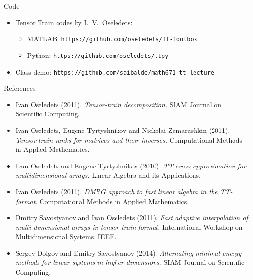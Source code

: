 \documentclass[aspectratio=169]{beamer}
\begin{document}
\begin{frame}{Code}
  \begin{itemize}
    \item
      Tensor Train codes by I.\ V.\ Oseledets:
      \begin{itemize}
        \item
          MATLAB: \texttt{https://github.com/oseledets/TT-Toolbox}
        \item
          Python: \texttt{https://github.com/oseledets/ttpy}
      \end{itemize}
    \item
      Class demo: \texttt{https://github.com/saibalde/math671-tt-lecture}
  \end{itemize}
\end{frame}

\begin{frame}{References}
  \begin{itemize}
    \item
      Ivan Oseledets (2011). \textit{Tensor-train decomposition.} SIAM Journal
      on Scientific Computing.
    \item
      Ivan Oseledets, Eugene Tyrtyshnikov and Nickolai Zamarashkin (2011).
      \textit{Tensor-train ranks for matrices and their inverses.} Computational
      Methods in Applied Mathematics.
    \item
      Ivan Oseledets and Eugene Tyrtyshnikov (2010). \textit{TT-cross
      approximation for multidimensional arrays.} Linear Algebra and its
      Applications.
    \item
      Ivan Oseledets (2011). \textit{DMRG approach to fast linear algebra in the
      TT-format.} Computational Methods in Applied Mathematics.
    \item
      Dmitry Savostyanov and Ivan Oseledets (2011). \textit{Fast adaptive
      interpolation of multi-dimensional arrays in tensor-train format.}
      International Workshop on Multidimensional Systems. IEEE.
    \item
      Sergey Dolgov and Dmitry Savostyanov (2014). \textit{Alternating minimal
      energy methods for linear systems in higher dimensions}. SIAM Journal on
      Scientific Computing.
  \end{itemize}
\end{frame}
\end{document}
